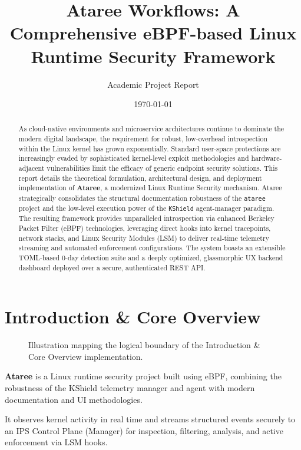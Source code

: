 \documentclass[
  12pt,
]{report}
\title{Ataree Workflows: A Comprehensive eBPF-based Linux Runtime
Security Framework}
\author{Academic Project Report}
\date{\today}
\begin{document}
\maketitle
\begin{abstract}
As cloud-native environments and microservice architectures continue to
dominate the modern digital landscape, the requirement for robust,
low-overhead introspection within the Linux kernel has grown
exponentially. Standard user-space protections are increasingly evaded
by sophisticated kernel-level exploit methodologies and
hardware-adjacent vulnerabilities limit the efficacy of generic endpoint
security solutions. This report details the theoretical formulation,
architectural design, and deployment implementation of \textbf{Ataree},
a modernized Linux Runtime Security mechanism. Ataree strategically
consolidates the structural documentation robustness of the
\texttt{ataree} project and the low-level execution power of the
\texttt{KShield} agent-manager paradigm. The resulting framework
provides unparalleled introspection via enhanced Berkeley Packet Filter
(eBPF) technologies, leveraging direct hooks into kernel tracepoints,
network stacks, and Linux Security Modules (LSM) to deliver real-time
telemetry streaming and automated enforcement configurations. The system
boasts an extensible TOML-based 0-day detection suite and a deeply
optimized, glassmorphic UX backend dashboard deployed over a secure,
authenticated REST API.
\end{abstract}

{
\setcounter{tocdepth}{2}
\tableofcontents
}
\newpage

\chapter{Introduction \& Core
Overview}\label{introduction-core-overview}

\begin{figure}[h]
\centering
\vspace{5cm}
\caption{Illustration mapping the logical boundary of the Introduction & Core Overview implementation.}
\end{figure}

\textbf{Ataree} is a Linux runtime security project built using eBPF,
combining the robustness of the KShield telemetry manager and agent with
modern documentation and UI methodologies.

It observes kernel activity in real time and streams structured events
securely to an IPS Control Plane (Manager) for inspection, filtering,
analysis, and active enforcement via LSM hooks.
\end{document}
